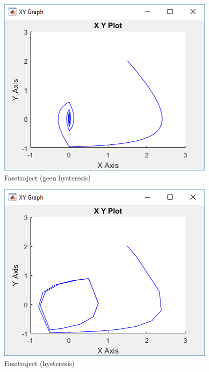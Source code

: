 \documentclass[12pt]{article}
\begin{document}
\newpage
\begin{figure}[!h]
	\centering
	\includegraphics[height=0.4\textheight, keepaspectratio]{xynohys.png}
	\caption{Fasetraject (geen hysteresis)}
	\label{xynohys}
\end{figure}
\begin{figure}[!h]
	\centering
	\includegraphics[height=0.4\textheight, keepaspectratio]{xyhys.png}
	\caption{Fasetraject (hysteresis)}
	\label{xyhys}
\end{figure}
\end{document}
